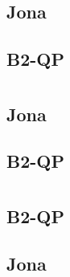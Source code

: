 \documentclass{article}
\begin{document}
\section{}
\subsection*{Jona}


\subsection*{B2-QP}


\section{}
\subsection*{Jona}


\subsection*{B2-QP}


\section{}
\subsection*{B2-QP}


\subsection*{Jona}

\end{document}

